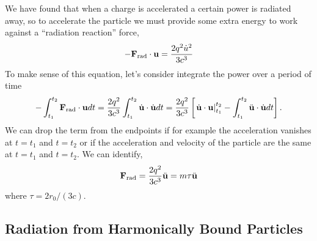 We have found that when a charge is accelerated a certain power is
radiated away, so to accelerate the particle we must provide some
extra energy to work against a ``radiation reaction'' force,
\begin{equation}
-{\bf F}_{\hbox{\rm \scriptsize rad}} \cdot {\bf u} = \frac{2 q^2 \dot{u}^2}{3 c^3}
\label{eq:242}
\end{equation}
To make sense of this equation, let's consider integrate the power
over a period of time
\begin{equation}
-\int_{t_1}^{t_2} {\bf F}_{\hbox{\rm \scriptsize rad}} \cdot {\bf u} dt = \frac{2 q^2 }{3
  c^3} \int_{t_1}^{t_2} \dot{\bf u} \cdot \dot{\bf u} dt = 
\frac{2 q^2 }{3 c^3} \left [ \left . \dot{\bf u} \cdot {\bf u} \right
  |_{t_1}^{t_2} - \int_{t_1}^{t_2} \ddot{\bf u} \cdot \dot{\bf u} dt
  \right ].
\label{eq:243}
\end{equation}
We can drop the term from the endpoints if for example the
acceleration vanishes at $t=t_1$ and $t=t_2$ or if the acceleration
and velocity of the particle are the same at $t=t_1$ and $t=t_2$.  We
can identify,
\begin{equation}
{\bf F}_{\hbox{\rm \scriptsize rad}} = \frac{2 q^2}{3 c^3} \ddot{\bf u} = m \tau
\ddot{\bf u}
\label{eq:244}
\end{equation}
where $\tau = 2 r_0/(3 c)$.

\subsection{Radiation from Harmonically Bound Particles}
\label{sec:radi-from-harm}

